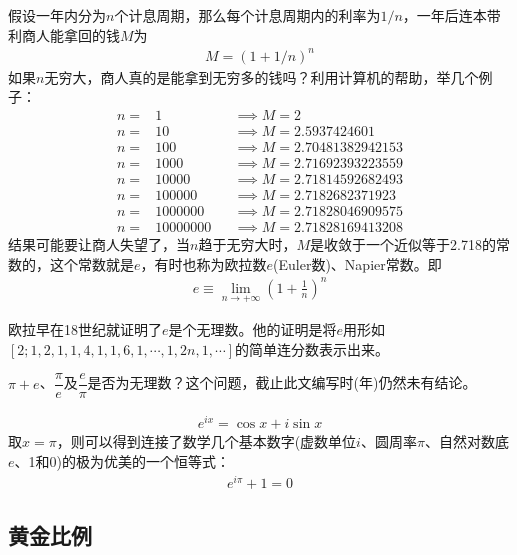 假设一年内分为$n$个计息周期，那么每个计息周期内的利率为$1/n$，一年后连本带利商人能拿回的钱$M$为
\begin{align*}
  M=(1+1/n)^n
\end{align*}
如果$n$无穷大，商人真的是能拿到无穷多的钱吗？利用计算机的帮助，举几个例子：
\begin{align*}
  n=&1       &&\implies M=2 \\
  n=&10      &&\implies M=2.5937424601\\
  n=&100     &&\implies M=2.70481382942153\\
  n=&1000    &&\implies M=2.71692393223559\\
  n=&10000   &&\implies M=2.71814592682493\\
  n=&100000  &&\implies M=2.7182682371923\\
  n=&1000000 &&\implies M=2.71828046909575\\
  n=&10000000&&\implies M=2.71828169413208
\end{align*}
结果可能要让商人失望了，当$n$趋于无穷大时，$M$是收敛于一个近似等于2.718的常数的，这个常数就是$e$，有时也称为欧拉数$e$(Euler数)、Napier常数。即
\begin{align*}
  e\equiv\lim_{n\to+\infty} \left(1+\frac1n\right)^n
\end{align*}

欧拉早在18世纪就证明了$e$是个无理数。他的证明是将$e$用形如$[2;1,2,1,1,4,1,1,6,1,\cdots,1,2n,1,\cdots]$的简单连分数表示出来。

\begin{question}
  $\pi + e$、$\dfrac{\pi}{e}$及$\dfrac{e}{\pi}$是否为无理数？这个问题，截止此文编写时({\the\year}年)仍然未有结论。
\end{question}

\begin{theorem}
  \begin{align*}
  e^{ix}=\cos x + i\sin x
  \end{align*}
  取$x=\pi$，则可以得到连接了数学几个基本数字(虚数单位$i$、圆周率$\pi$、自然对数底$e$、1和0)的极为优美的一个恒等式：
  \begin{align*}
    e^{i\pi} + 1 = 0
  \end{align*}
\end{theorem}

\subsection{黄金比例}
\label{sec:irrational-number-golden-ratio}

